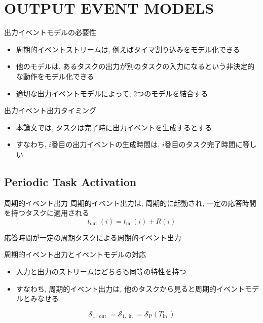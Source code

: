 
\section{OUTPUT EVENT MODELS}
\label{sec: output event models}

\begin{frame}{出力イベントモデルの必要性}
    \begin{itemize}
        \item 周期的イベントストリームは, 例えばタイマ割り込みをモデル化できる
        \item 他のモデルは, あるタスクの出力が別のタスクの入力になるという非決定的な動作をモデル化できる
        \item 適切な出力イベントモデルによって, 2つのモデルを結合する
    \end{itemize}
\end{frame}

\begin{frame}{出力イベント出力タイミング}
    \begin{itemize}
        \item 本論文では, タスクは完了時に出力イベントを生成するとする
        \item すなわち, $i$番目の出力イベントの生成時間は, $i$番目のタスク完了時間に等しい
    \end{itemize}
\end{frame}



\subsection{Periodic Task Activation}
\label{ssec: periodic task activation}

\begin{frame}{周期的イベント出力}
    周期的イベント出力は, 周期的に起動され, 一定の応答時間を持つタスクに適用される
    \begin{equation*}
        t_{\text {out }}(i)=t_{\text {in }}(i)+R(i)
    \end{equation*}
\end{frame}

\begin{frame}{応答時間が一定の周期タスクによる周期的イベント出力}
\end{frame}

\begin{frame}{周期的イベント出力とイベントモデルの対応}
    \begin{itemize}
        \item 入力と出力のストリームはどちらも同等の特性を持つ
        \item すなわち, 周期的イベント出力は, 他のタスクから見ると周期的イベントモデルとみなせる
    \end{itemize}
    \begin{equation*}
        \mathcal{S}_{1, \text { out }}=\mathcal{S}_{1, \text { in }}=\mathcal{S}_{\mathrm{P}}\left(T_{\text {in }}\right)
    \end{equation*}
\end{frame}

